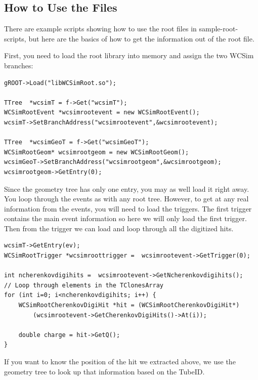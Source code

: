 \subsection{How to Use the Files}




There are example scripts showing how to use the root files in sample-root-scripts, but here are the basics of how to get the information out of the root file.

First, you need to load the root library into memory and assign the two WCSim branches:
\begin{lstlisting}
gROOT->Load("libWCSimRoot.so");

TTree  *wcsimT = f->Get("wcsimT");
WCSimRootEvent *wcsimrootevent = new WCSimRootEvent();
wcsimT->SetBranchAddress("wcsimrootevent",&wcsimrootevent);

TTree  *wcsimGeoT = f->Get("wcsimGeoT");
WCSimRootGeom* wcsimrootgeom = new WCSimRootGeom();
wcsimGeoT->SetBranchAddress("wcsimrootgeom",&wcsimrootgeom);  
wcsimrootgeom->GetEntry(0);
\end{lstlisting}

Since the geometry tree has only one entry, you may as well load it right away.  You loop through the events as with any root tree.   However, to get at any real information from the events, you will need to load the triggers.  The first trigger contains the main event information so here we will only load the first trigger.  Then from the trigger we can load and loop through all the digitized hits.

\begin{lstlisting}
wcsimT->GetEntry(ev);
WCSimRootTrigger *wcsimroottrigger =  wcsimrootevent->GetTrigger(0);

int ncherenkovdigihits =  wcsimrootevent->GetNcherenkovdigihits(); 
// Loop through elements in the TClonesArray
for (int i=0; i<ncherenkovdigihits; i++) {
    WCSimRootCherenkovDigiHit *hit = (WCSimRootCherenkovDigiHit*)
        (wcsimrootevent->GetCherenkovDigiHits()->At(i));

    double charge = hit->GetQ();
}
\end{lstlisting}

If you want to know the position of the hit we extracted above, we use the geometry tree to look up that information based on the TubeID.

